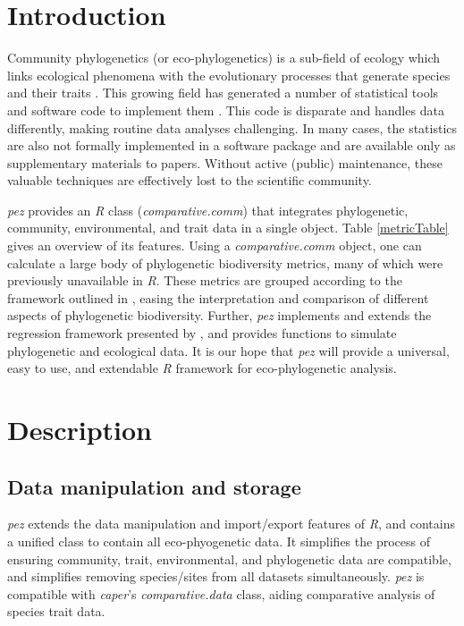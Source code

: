 \documentclass{bioinfo}
\begin{document}
\section{Introduction}
Community phylogenetics (or eco-phylogenetics) is a sub-field of
ecology which links ecological phenomena with the evolutionary
processes that generate species and their traits
\citep[see][]{Webb2002,Cavender-Bares2009}. This growing field has
generated a number of statistical tools and software code to implement
them
\citep[\emph{e.g.},][]{Webb2008,Regetz2009,Kembel2010,Orme2013,Eastman2013}. This
code is disparate and handles data differently, making routine data
analyses challenging. In many cases, the statistics are also not
formally implemented in a software package and are available only as
supplementary materials to papers. Without active (public)
maintenance, these valuable techniques are effectively lost to the
scientific community.

\emph{pez} provides an \emph{R} \citep{R2014} class
(\emph{comparative.comm}) that integrates phylogenetic, community,
environmental, and trait data in a single object. Table
\ref{metricTable} gives an overview of its features. Using a
\emph{comparative.comm} object, one can calculate a large body of
phylogenetic biodiversity metrics, many of which were previously
unavailable in \emph{R}. These metrics are grouped according to the
framework outlined in \citet{Pearse2014review}, easing the
interpretation and comparison of different aspects of phylogenetic
biodiversity. Further, \emph{pez} implements and extends the
regression framework presented by \citep{Cavender-Bares2004}, and
provides functions to simulate phylogenetic and ecological data. It is
our hope that \emph{pez} will provide a universal, easy to use, and
extendable \emph{R} framework for eco-phylogenetic analysis.
\section{Description}
\subsection{Data manipulation and storage}
\emph{pez} extends the data manipulation and import/export features of
\emph{R}, and contains a unified class to contain all eco-phyogenetic
data. It simplifies the process of ensuring community, trait,
environmental, and phylogenetic data are compatible, and simplifies
removing species/sites from all datasets simultaneously. \emph{pez} is
compatible with \emph{caper}'s \citep{Orme2013}
\emph{comparative.data} class, aiding comparative analysis of species
trait data.
\end{document}
